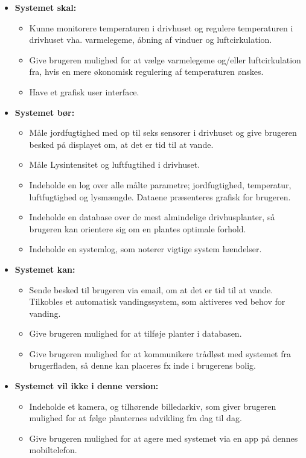 \begin{itemize}
	\item \textbf{Systemet skal:}
		\begin{itemize}
			\item Kunne monitorere temperaturen i drivhuset og regulere temperaturen i drivhuset vha. varmelegeme, åbning af vinduer og luftcirkulation.
			\item Give brugeren mulighed for at vælge varmelegeme og/eller luftcirkulation fra, hvis en mere økonomisk regulering af temperaturen ønskes. 
			\item Have et grafisk user interface.
		\end{itemize}
	\item \textbf{Systemet bør:}
		\begin{itemize}
			\item Måle jordfugtighed med op til seks sensorer i drivhuset og give brugeren besked på displayet om, at det er tid til at vande. 
			\item Måle Lysintensitet og luftfugtihed i drivhuset.
			\item Indeholde en log over alle målte parametre; jordfugtighed, temperatur, luftfugtighed og lysmængde. 
			Dataene præsenteres grafisk for brugeren.
			\item Indeholde en database over de mest almindelige drivhusplanter, så brugeren kan orientere sig om en plantes optimale forhold.
			\item Indeholde en systemlog, som noterer vigtige system hændelser.
		\end{itemize}
	\item \textbf{Systemet kan:}
		\begin{itemize}
			\item Sende besked til brugeren via email, om at det er tid til at vande.
Tilkobles et automatisk vandingssystem, som aktiveres ved behov for vanding. 
			\item Give brugeren mulighed for at tilføje planter i databasen.
			\item Give brugeren mulighed for at kommunikere trådløst med systemet fra brugerfladen, så denne kan placeres fx inde i brugerens bolig. 
		\end{itemize}
	\item \textbf{Systemet vil ikke i denne version:}	
		\begin{itemize}
			\item Indeholde et kamera, og tilhørende billedarkiv, som giver brugeren mulighed for at følge planternes udvikling fra dag til dag. 
			\item Give brugeren mulighed for at agere med systemet via en app på dennes mobiltelefon. 
		\end{itemize}
\end{itemize}
\clearpage

